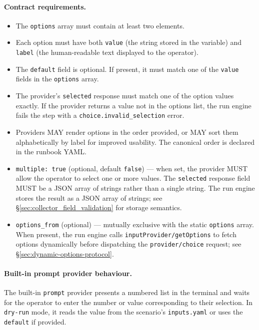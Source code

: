 \paragraph{Contract requirements.}
\begin{itemize}
  \item The \texttt{options} array must contain at least two elements.
  \item Each option must have both \texttt{value} (the string stored in the
        variable) and \texttt{label} (the human-readable text displayed to the
        operator).
  \item The \texttt{default} field is optional.  If present, it must match one
        of the \texttt{value} fields in the \texttt{options} array.
  \item The provider's \texttt{selected} response must match one of the option
        values exactly.  If the provider returns a value not in the options
        list, the run engine fails the step with a
        \texttt{choice.invalid\_selection} error.
  \item Providers MAY render options in the order provided, or MAY sort them
        alphabetically by label for improved usability.  The canonical order is
        declared in the runbook YAML.
  \item \texttt{multiple: true} (optional, default \texttt{false}) — when set, the
        provider MUST allow the operator to select one or more values.  The
        \texttt{selected} response field MUST be a JSON array of strings rather than a
        single string.  The run engine stores the result as a JSON array of strings; see
        §\ref{sec:collector_field_validation} for storage semantics.
  \item \texttt{options\_from} (optional) — mutually exclusive with the static
        \texttt{options} array.  When present, the run engine calls
        \texttt{inputProvider/getOptions} to fetch options dynamically before dispatching
        the \texttt{provider/choice} request; see §\ref{sec:dynamic-options-protocol}.
\end{itemize}

\paragraph{Built-in prompt provider behaviour.}
The built-in \texttt{prompt} provider presents a numbered list in the terminal
and waits for the operator to enter the number or value corresponding to their
selection.  In \texttt{dry-run} mode, it reads the value from the scenario's
\texttt{inputs.yaml} or uses the \texttt{default} if provided.

